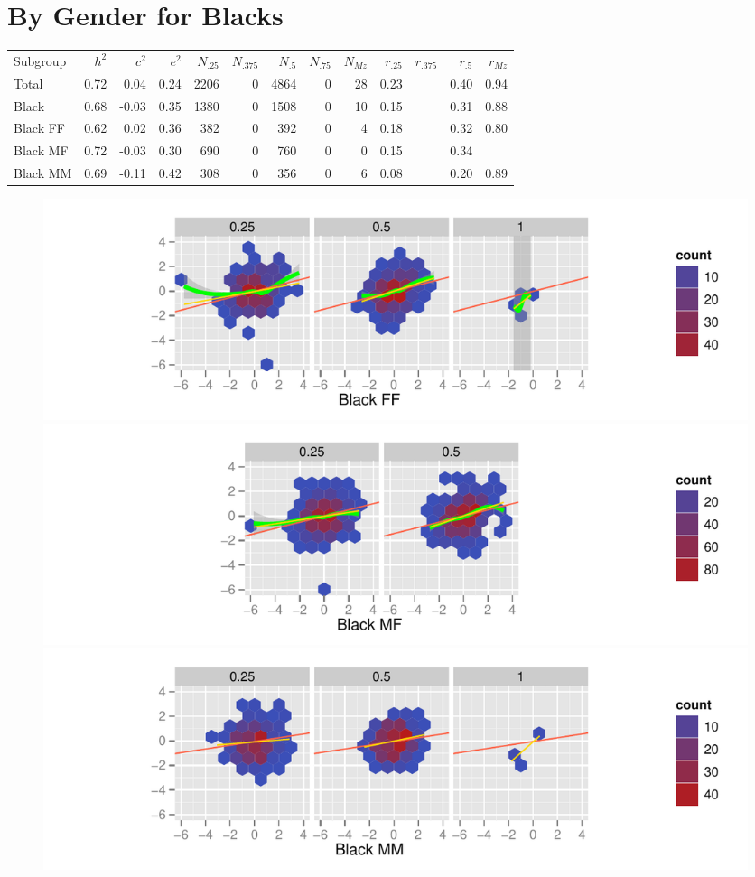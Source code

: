 \documentclass[a4paper]{article}
\begin{document}
\newpage
\section{By Gender for Blacks}
\begin{table}[ht]
\begin{center}
\begin{tabular}{l|rrr|rrrrr|rrrr}
 Subgroup & $h^2$ & $c^2$ & $e^2$ & $N_{.25}$ & $N_{.375}$ & $N_{.5}$ & $N_{.75}$ & $N_{Mz}$ & $r_{.25}$ & $r_{.375}$ & $r_{.5}$ & $r_{Mz}$ \\ 
 Total & 0.72 & 0.04 & 0.24 & 2206 &   0 & 4864 &   0 &  28 & 0.23 &  & 0.40 & 0.94 \\ 
   \hline
Black & 0.68 & -0.03 & 0.35 & 1380 &   0 & 1508 &   0 &  10 & 0.15 &  & 0.31 & 0.88 \\ 
  Black FF & 0.62 & 0.02 & 0.36 & 382 &   0 & 392 &   0 &   4 & 0.18 &  & 0.32 & 0.80 \\ 
  Black MF & 0.72 & -0.03 & 0.30 & 690 &   0 & 760 &   0 &   0 & 0.15 &  & 0.34 &  \\ 
  Black MM & 0.69 & -0.11 & 0.42 & 308 &   0 & 356 &   0 &   6 & 0.08 &  & 0.20 & 0.89 \\ 
  \end{tabular}
\end{center}
\end{table}\begin{figure}[htbp]
\includegraphics{Height-018}
\includegraphics{Height-019}
\includegraphics{Height-020}
\end{figure}
\end{document}
